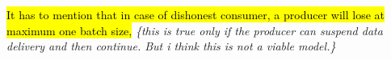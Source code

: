 \documentclass[letterpaper, 10 pt, conference]{ieeeconf}  %
\newcommand{\mycomment}[2]{\hl{#1} {{\leavevmode\smaller\color{red}\itshape\{#2\}}}}
\begin{document}
	\mycomment{It has to mention that in case of dishonest consumer, a producer will lose at maximum one batch size,}{this is true only if the producer can suspend data delivery and then continue. But i think this is not a viable model.}
%
%
% 
%








\end{document}
